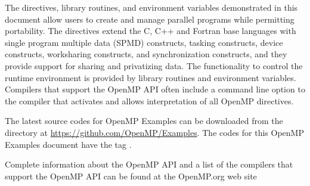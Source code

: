 The directives, library routines, and environment variables demonstrated in this
document allow users to create and manage parallel programs while permitting
portability. The directives extend the C, C++ and Fortran base languages with single
program multiple data (SPMD) constructs, tasking constructs, device constructs,
worksharing constructs, and synchronization constructs, and they provide support for
sharing and privatizing data. The functionality to control the runtime environment is
provided by library routines and environment variables. Compilers that support the
OpenMP API often include a command line option to the compiler that activates and
allows interpretation of all OpenMP directives.

The latest source codes for OpenMP Examples can be downloaded from the 
directory at
\href{https://github.com/OpenMP/Examples}{https://github.com/OpenMP/Examples}.
The codes for this OpenMP \VER{} Examples document have the tag .


Complete information about the OpenMP API and a list of the compilers that support
the OpenMP API can be found at the OpenMP.org web site




